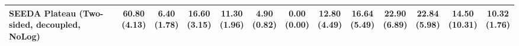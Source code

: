 \begin{table}[H]
{\begin{tabular}{l|cccccc|cccccc}
SEEDA Plateau (Two-sided, decoupled, NoLog) & \bfseries \makecell{60.80 \\ (4.13)} & \makecell{6.40 \\ (1.78)} & {\cellcolor[HTML]{C8E6C9}} \makecell{16.60 \\ (3.15)} & \makecell{11.30 \\ (1.96)} & \makecell{4.90 \\ (0.82)} & \makecell{0.00 \\ (0.00)} & \makecell{12.80 \\ (4.49)} & \makecell{16.64 \\ (5.49)} & {\cellcolor[HTML]{C8E6C9}} \bfseries \makecell{22.90 \\ (6.89)} & \makecell{22.84 \\ (5.98)} & \makecell{14.50 \\ (10.31)} & \makecell{10.32 \\ (1.76)} \\
\bottomrule
\end{tabular}
}%
\end{table}
